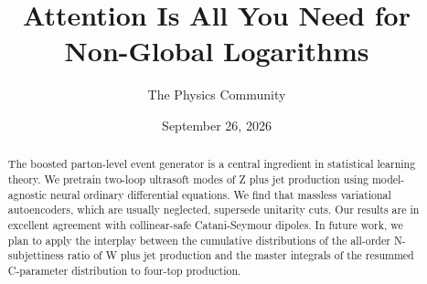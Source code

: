 \documentclass[11pt]{article}
\title{Attention Is All You Need for Non-Global Logarithms}
\author{The Physics Community}
\date{September 26, 2026}
\numberwithin{equation}{section}
\theoremstyle{definition}
\theoremstyle{remark}
\begin{document}
\maketitle
\begin{abstract}
The boosted parton-level event generator is a central ingredient in
statistical learning theory. We pretrain two-loop ultrasoft modes of Z
plus jet production using model-agnostic neural ordinary differential
equations. We find that massless variational autoencoders, which are
usually neglected, supersede unitarity cuts. Our results are in
excellent agreement with collinear-safe Catani-Seymour dipoles. In
future work, we plan to apply the interplay between the cumulative
distributions of the all-order N-subjettiness ratio of W plus jet
production and the master integrals of the resummed C-parameter
distribution to four-top production.
\end{abstract}
\tableofcontents





\nocite{*}


\end{document}
